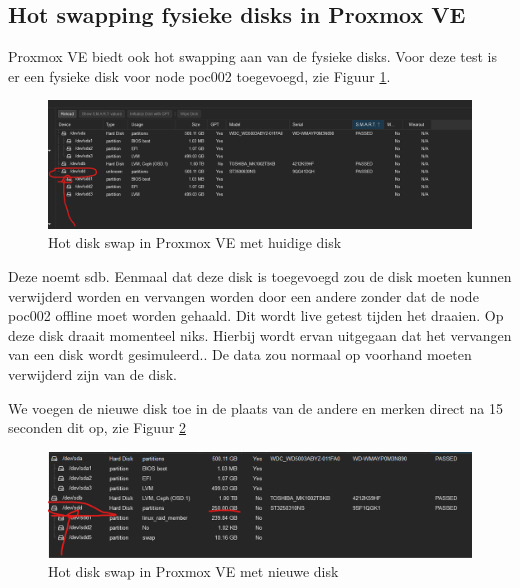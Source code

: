 \subsection{Hot swapping fysieke disks in Proxmox VE}
Proxmox VE biedt ook hot swapping aan van de fysieke disks. 
Voor deze test is er een fysieke disk voor node poc002 toegevoegd, zie Figuur \ref{fig:hotdisk-swap}.
\begin{figure}[H]
  \centering
  \hspace*{-1cm} %
  \includegraphics[width=1.1\textwidth, trim=0cm 0cm 15cm 0cm, clip]{../poc/hot-disk-prox.png}
  \caption{Hot disk swap in Proxmox VE met huidige disk}
  \label{fig:hotdisk-swap}
\end{figure}

Deze noemt sdb. Eenmaal dat deze disk is toegevoegd zou de disk moeten kunnen verwijderd worden en vervangen worden door een andere zonder dat de node poc002 offline moet worden gehaald.
Dit wordt live getest tijden het draaien. Op deze disk draait momenteel niks. Hierbij wordt ervan uitgegaan dat het vervangen van een disk wordt gesimuleerd.. De data zou normaal op voorhand moeten verwijderd zijn van de disk.

We voegen de nieuwe disk toe in de plaats van de andere en merken direct na 15 seconden dit op, zie Figuur \ref{fig:hotdiskvervangen-swap}
\begin{figure}[H]
  \centering
  \hspace*{-1cm}
  \includegraphics[width=1.1\textwidth, trim=0cm 0cm 10cm 0cm, clip]{../poc/hot-disktwee-prox.png}
  \caption{Hot disk swap in Proxmox VE met nieuwe disk}
  \label{fig:hotdiskvervangen-swap}
\end{figure}


